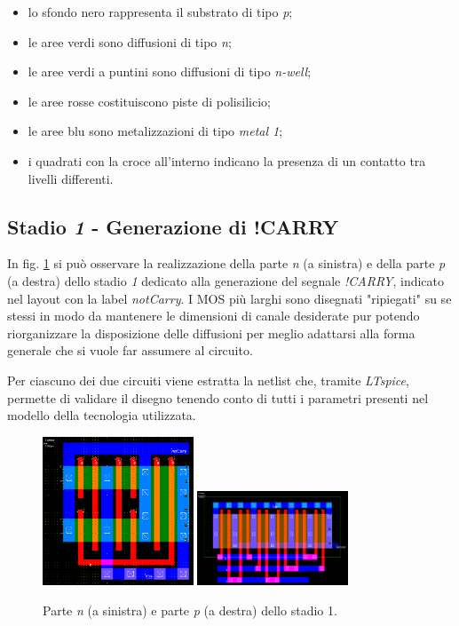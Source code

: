 \begin{itemize}
	\item lo sfondo nero rappresenta il substrato di tipo \textit{p};
	\item le aree verdi sono diffusioni di tipo \textit{n};
	\item le aree verdi a puntini sono diffusioni di tipo \textit{n-well};
	\item le aree rosse costituiscono piste di polisilicio;
	\item le aree blu sono metalizzazioni di tipo \textit{metal 1}; 
	\item i quadrati con la croce all'interno indicano la presenza di un contatto tra livelli differenti.
\end{itemize}

\subsection{Stadio \textit{1} - Generazione di !CARRY}

In fig. \ref{fig:NMOSePMOSnotCarry} si può osservare la realizzazione della parte \textit{n} (a sinistra) e della parte \textit{p} (a destra) dello stadio \textit{1} dedicato alla generazione del segnale \textit{!CARRY}, indicato nel layout con la label \textit{notCarry}. I MOS più larghi sono disegnati "ripiegati" su se stessi in modo da mantenere le dimensioni di canale desiderate pur potendo riorganizzare la disposizione delle diffusioni per meglio adattarsi alla forma generale che si vuole far assumere al circuito. 

Per ciascuno dei due circuiti viene estratta la netlist che, tramite \textit{LTspice}, permette di validare il disegno tenendo conto di tutti i parametri presenti nel modello della tecnologia utilizzata.

\begin{figure}[hbt!]
	\centering
	\includegraphics[width=0.4\textwidth]{figure/Msk_NMOS_notCarry_V2.png}\hfil
	\includegraphics[width=0.4\textwidth]{figure/Msk_PMOS_notCarry_V2.png}
	\caption{Parte \textit{n} (a sinistra) e parte \textit{p} (a destra) dello stadio 1.}
	\label{fig:NMOSePMOSnotCarry}
\end{figure} 

